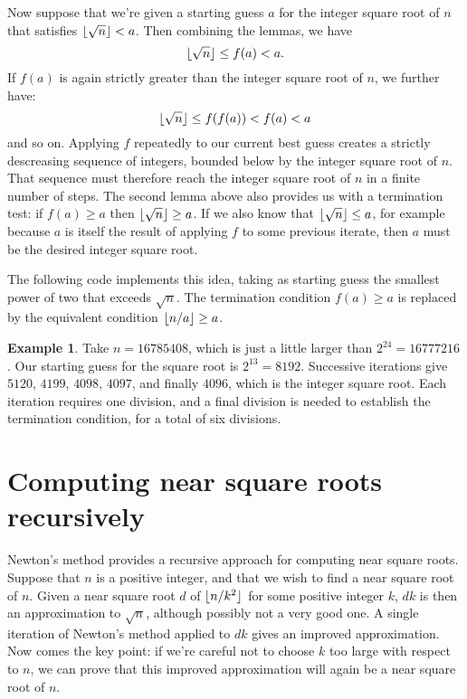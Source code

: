 \documentclass[a4paper]{article}
\DeclarePairedDelimiter\floor{\lfloor}{\rfloor}
\theoremstyle{plain}
\theoremstyle{definition}
\newtheorem{example}{Example}
\begin{document}
Now suppose that we're given a starting guess $a$ for the integer square root
of $n$ that satisfies $\floor{\sqrt n} < a$. Then combining the lemmas, we
have
$$\floor{\sqrt n} \le f(a) < a.$$
If $f(a)$ is again strictly greater than the integer square root of $n$, we
further have:
$$\floor{\sqrt n} \le f(f(a)) < f(a) < a$$
and so on. Applying $f$ repeatedly to our current best guess creates a strictly
descreasing sequence of integers, bounded below by the integer square root of
$n$. That sequence must therefore reach the integer square root of $n$ in a
finite number of steps. The second lemma above also provides us with a
termination test: if $f(a) \ge a$ then $\floor{\sqrt n} \ge a$. If we also know
that $\floor{\sqrt n} \le a$, for example because $a$ is itself the result
of applying $f$ to some previous iterate, then $a$ must be the desired
integer square root.

The following code implements this idea, taking as starting guess the
smallest power of two that exceeds $\sqrt n$. The termination condition
$f(a) \ge a$ is replaced by the equivalent condition $\floor{n/a} \ge a$.



\begin{example}
  Take $n = 16785408$, which is just a little larger than $2^{24} = 16777216$.
  Our starting guess for the square root is $2^{13} = 8192$. Successive
  iterations give $5120$, $4199$, $4098$, $4097$, and finally $4096$, which
  is the integer square root. Each iteration requires one division, and
  a final division is needed to establish the termination condition, for
  a total of six divisions.
\end{example}


\section{Computing near square roots recursively}

Newton's method provides a recursive approach for computing near square roots.
Suppose that $n$ is a positive integer, and that we wish to find a near square
root of $n$. Given a near square root $d$ of $\floor{n / k^2}$ for some
positive integer $k$, $dk$ is then an approximation to $\sqrt n$, although
possibly not a very good one. A single iteration of Newton's method applied to
$dk$ gives an improved approximation. Now comes the key point: if we're careful
not to choose $k$ too large with respect to $n$, we can prove that this
improved approximation will again be a near square root of $n$.
\end{document}
